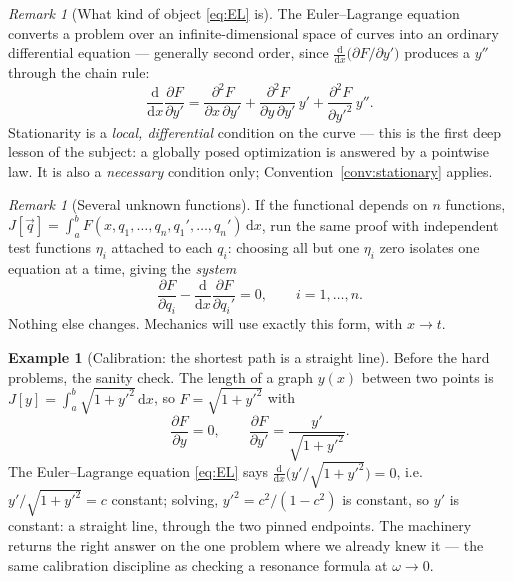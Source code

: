 \documentclass[11pt]{article}
\theoremstyle{plain}
\theoremstyle{definition}
\newtheorem{example}[theorem]{Example}
\theoremstyle{remark}
\newtheorem{remark}[theorem]{Remark}
\newcommand{\dd}{\mathrm{d}}
\newcommand{\pd}[2]{\frac{\partial #1}{\partial #2}}
\newcommand{\vq}{\vec{q}}
\begin{document}
\begin{remark}[What kind of object \eqref{eq:EL} is]
The Euler--Lagrange equation converts a problem over an
infinite-dimensional space of curves into an ordinary differential
equation --- generally second order, since
$\tfrac{\dd}{\dd x}\bigl(\partial F/\partial y'\bigr)$ produces a $y''$
through the chain rule:
\begin{equation}
  \frac{\dd}{\dd x}\pd{F}{y'}
  = \frac{\partial^2 F}{\partial x\,\partial y'}
  + \frac{\partial^2 F}{\partial y\,\partial y'}\,y'
  + \frac{\partial^2 F}{\partial y'^2}\,y'' .
  \label{eq:EL-expanded}
\end{equation}
Stationarity is a \emph{local, differential} condition on the curve ---
this is the first deep lesson of the subject: a globally posed optimization
is answered by a pointwise law. It is also a \emph{necessary} condition
only; Convention~\ref{conv:stationary} applies.
\end{remark}

\begin{remark}[Several unknown functions]\label{rem:vector-EL}
If the functional depends on $n$ functions,
$J[\vq] = \int_a^b F(x, q_1,\dots,q_n, q_1',\dots,q_n')\,\dd x$, run the
same proof with independent test functions $\eta_i$ attached to each
$q_i$: choosing all but one $\eta_i$ zero isolates one equation at a time,
giving the \emph{system}
\begin{equation}
  \boxed{\;
  \pd{F}{q_i} - \frac{\dd}{\dd x}\pd{F}{q_i'} = 0,
  \qquad i = 1, \dots, n .
  \;}
  \label{eq:EL-system}
\end{equation}
Nothing else changes. Mechanics will use exactly this form, with $x \to t$.
\end{remark}

\begin{example}[Calibration: the shortest path is a straight line]
\label{ex:shortest-path}
Before the hard problems, the sanity check. The length of a graph
$y(x)$ between two points is $J[y] = \int_a^b \sqrt{1 + y'^2}\,\dd x$, so
$F = \sqrt{1+y'^2}$ with
\begin{equation}
  \pd{F}{y} = 0,
  \qquad
  \pd{F}{y'} = \frac{y'}{\sqrt{1+y'^2}} .
\end{equation}
The Euler--Lagrange equation \eqref{eq:EL} says
$\tfrac{\dd}{\dd x}\bigl(y'/\sqrt{1+y'^2}\bigr) = 0$, i.e.\
$y'/\sqrt{1+y'^2} = c$ constant; solving, $y'^2 = c^2/(1-c^2)$ is
constant, so $y' $ is constant: a straight line, through the two pinned
endpoints. The machinery returns the right answer on the one problem
where we already knew it --- the same calibration discipline as checking
a resonance formula at $\omega \to 0$.
\end{example}
\end{document}
